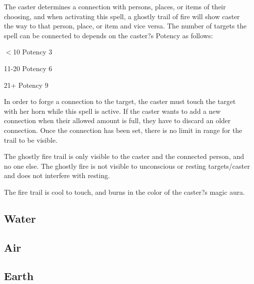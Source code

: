 \documentclass[11pt,a4paper,twocolumn]{book}
\begin{document}
	\medskip
	
	The caster determines a connection with persons, places, or items of their choosing, and when activating this spell, a ghostly trail of fire will show caster the way to that person, place, or item and vice versa. The number of targets the spell can be connected to depends on the caster?s Potency as follows:
	
	\begin{compactitem}
		\item $<$10 Potency 		3
		\item 11-20 Potency 		6
		\item 21+ Potency 			9
	\end{compactitem}
	
	In order to forge a connection to the target, the caster must touch the target with her horn while this spell is active. If the caster wants to add a new connection when their allowed amount is full, they have to discard an older connection. Once the connection has been set, there is no limit in range for the trail to be visible.
	
	The ghostly fire trail is only visible to the caster and the connected person, and no one else. The ghostly fire is not visible to unconscious or resting targets/caster and does not interfere with resting.
	
	The fire trail is cool to touch, and burns in the color of the caster?s magic aura.
	
	
	\subsection*{Water}
	
	\subsection*{Air}
	
	\subsection*{Earth}
	
	

	
	
	
	
	
	
	
	
	
	
   
\end{document}
